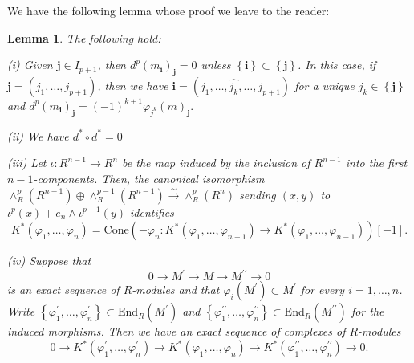 \documentclass[asterisque,english]{smfart}
\newtheorem{lemma}[theo]{Lemma}
\begin{document}
We have the following lemma whose proof we leave to the reader:

\begin{lemma}\label{lemma:Koszul}  The following hold:\smallskip


(i) Given $\mathbf{j}\in I_{p+1}$, then $d^{p}\left( m_{\mathbf{i}
}\right) _{\mathbf{j}}=0$ unless  $\left\{ \mathbf{i}\right\} \subset \left\{ \mathbf{j}\right\} $. In this case, if  $\mathbf{j}=\left( j_{1},\ldots,j_{p+1}\right) $, then we have $\mathbf{i}=
\left( j_{1},\ldots,\widehat{j_k},\ldots,j_{p+1}\right) $ for a unique $j_k\in
\left\{ \mathbf{j}\right\} $ and $d^{p}\left( m_{\mathbf{i}
}\right) _{\mathbf{j}}=\left( -1\right) ^{k+1}\varphi _{j^{k}}\left(
m\right) _{\mathbf{j}}.$

\smallskip

(ii) We have $d^\ast\circ d^\ast=0$

\smallskip


(iii) Let $\iota \colon R^{n-1} \to R^n$ be the map induced by the inclusion of $R^{n-1}$ into the first $n-1$-components. Then, the canonical isomorphism $\wedge
_{R}^{p}\left( R^{n-1}\right) \oplus \wedge _{R}^{p-1}\left( R^{n-1}\right) 
\overset{\sim }{\rightarrow }\wedge _{R}^{p}\left( R^{n}\right) $ sending $
\left( x,y\right) $ to $\iota ^{p}\left( x\right) +e_{n}\wedge \iota
^{p-1}\left( y\right) $ identifies
\begin{equation*}
K^\ast\left( \varphi _{1},\ldots,\varphi _{n}\right) =\mathrm{Cone}\left(
-\varphi _{n}:K^\ast\left( \varphi _{1},\ldots,\varphi _{n-1}\right)
\rightarrow K^\ast\left( \varphi _{1},\ldots,\varphi _{n-1}\right) \right) %
\left[ -1\right].
\end{equation*}

\smallskip


(iv) Suppose that
\begin{equation*}
0\longrightarrow M^{\prime }\longrightarrow M\longrightarrow M^{\prime
\prime }\longrightarrow 0
\end{equation*}
is an exact sequence of $R$-modules and that  $\varphi
_{i}\left( M^{\prime }\right) \subset M^{\prime }$ for every $i=1,\ldots,n$.
Write $\left\{ \varphi _{1}^{\prime },\ldots,\varphi _{n}^{\prime }\right\}
\subset \mathrm{End}_{R}\left( M^{\prime }\right) $ and $\left\{ \varphi _{1}^{\prime
\prime },\ldots,\varphi _{n}^{\prime \prime }\right\} \subset \mathrm{End}_{R}\left(
M^{\prime \prime }\right) $ for the induced morphisms. Then we have 
an exact sequence of complexes of $R$-modules%
\begin{equation*}
0\longrightarrow K^\ast\left( \varphi _{1}^{\prime },\ldots,\varphi
_{n}^{\prime }\right) \longrightarrow K^\ast\left( \varphi
_{1},\ldots,\varphi _{n}\right) \longrightarrow K^\ast\left( \varphi
_{1}^{\prime \prime },\ldots,\varphi _{n}^{\prime \prime }\right)
\longrightarrow 0.
\end{equation*}


\end{lemma}
\end{document}
